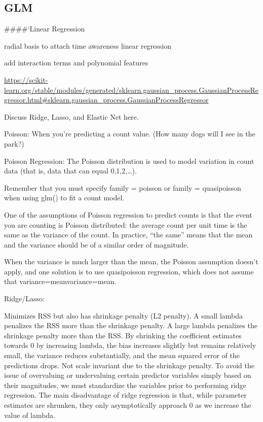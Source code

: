 \documentclass[]{book}
\begin{document}
\hypertarget{glm}{%
\subsection{GLM}\label{glm}}

\#\#\#\#`Linear Regression

radial basis to attach time awareness linear regression

add interaction terms and polynomial features

\url{https://scikit-learn.org/stable/modules/generated/sklearn.gaussian_process.GaussianProcessRegressor.html\#sklearn.gaussian_process.GaussianProcessRegressor}

Discuss Ridge, Lasso, and Elastic Net here.

Poisson: When you're predicting a count value. (How many dogs will I see in the park?)

Poisson Regression: The Poisson distribution is used to model variation in count data (that is, data that can equal 0,1,2,\ldots{}).

Remember that you must specify family = poisson or family = quasipoisson when using glm() to fit a count model.

One of the assumptions of Poisson regression to predict counts is that the event you are counting is Poisson distributed: the average count per unit time is the same as the variance of the count. In practice, ``the same'' means that the mean and the variance should be of a similar order of magnitude.

When the variance is much larger than the mean, the Poisson assumption doesn't apply, and one solution is to use quasipoisson regression, which does not assume that variance=meanvariance=mean.

Ridge/Lasso:

Minimizes RSS but also has shrinkage penalty (L2 penalty). A small lambda penalizes the RSS more than the shrinkage penalty. A large lambda penalizes the shrinkage penalty more than the RSS. By shrinking the coefficient estimates towards 0 by increasing lambda, the bias increases slightly but remains relatively small, the variance reduces substantially, and the mean squared error of the predictions drops. Not scale invariant due to the shrinkage penalty. To avoid the issue of overvaluing or undervaluing certain predictor variables simply based on their magnitudes, we must standardize the variables prior to performing ridge regression. The main disadvantage of ridge regression is that, while parameter estimates are shrunken, they only asymptotically approach 0 as we increase the value of lambda.
\end{document}
